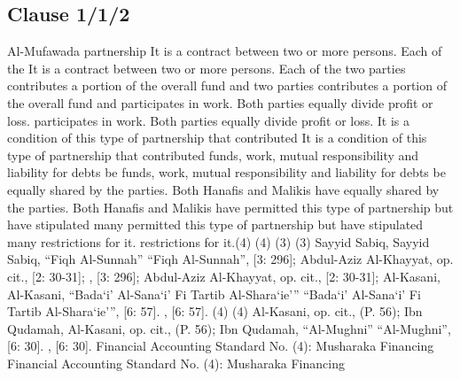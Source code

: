 \documentclass{article}%
\begin{document}
%
\subsection{Clause 1/1/2}%
\label{subsec:Clause1/1/2}%
Al-Mufawada partnership   It is a contract between two or more persons. Each of the    It is a contract between two or more persons. Each of the  two parties contributes a portion of the overall fund and  two parties contributes a portion of the overall fund and  participates in work. Both parties equally divide profit or loss.  participates in work. Both parties equally divide profit or loss.  It is a condition of this type of partnership that contributed  It is a condition of this type of partnership that contributed  funds, work, mutual responsibility and liability for debts be  funds, work, mutual responsibility and liability for debts be  equally shared by the parties. Both Hanafis and Malikis have  equally shared by the parties. Both Hanafis and Malikis have  permitted this type of partnership but have stipulated many  permitted this type of partnership but have stipulated many  restrictions for it. restrictions for it.(4) (4) (3) (3) Sayyid Sabiq,   Sayyid Sabiq, “Fiqh Al-Sunnah” “Fiqh Al-Sunnah”, [3: 296]; Abdul-Aziz Al-Khayyat, op. cit., [2: 30-31];  , [3: 296]; Abdul-Aziz Al-Khayyat, op. cit., [2: 30-31];  Al-Kasani,  Al-Kasani, “Bada`i’ Al-Sana`i’ Fi Tartib Al-Shara`ie’” “Bada`i’ Al-Sana`i’ Fi Tartib Al-Shara`ie’”, [6: 57]. , [6: 57]. (4) (4) Al-Kasani, op. cit., (P. 56); Ibn Qudamah,   Al-Kasani, op. cit., (P. 56); Ibn Qudamah, “Al-Mughni” “Al-Mughni”, [6: 30]. , [6: 30]. Financial Accounting Standard No. (4): Musharaka Financing Financial Accounting Standard No. (4): Musharaka Financing

%
\end{document}
